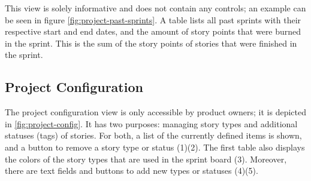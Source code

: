 \documentclass[
	accentcolor=tud1a %
]{tudreport}
\begin{document}
This view is solely informative and does not contain any controls; an example can be seen in figure \ref{fig:project-past-sprints}. A table lists all past sprints with their respective start and end dates, and the amount of story points that were burned in the sprint. This is the sum of the story points of stories that were finished in the sprint.

\subsection{Project Configuration}
\label{sec:proj-config}


The project configuration view is only accessible by product owners; it is depicted in \ref{fig:project-config}. It has two purposes: managing story types and additional statuses (tags) of stories. For both, a list of the currently defined items is shown, and a button to remove a story type or status (1)(2). The first table also displays the colors of the story types that are used in the sprint board (3). Moreover, there are text fields and buttons to add new types or statuses (4)(5). 
\end{document}

